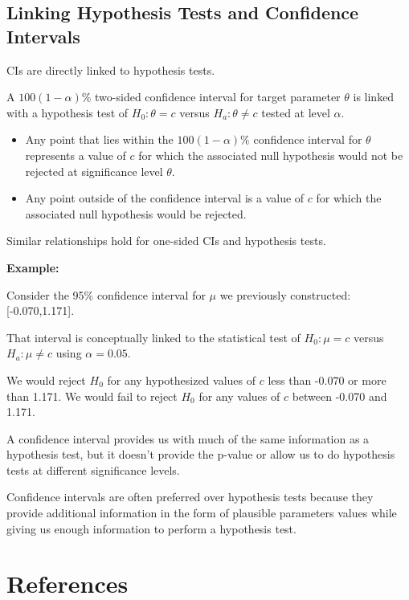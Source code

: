 \documentclass[
]{book}
\providecommand{\tightlist}{%
  \setlength{\itemsep}{0pt}\setlength{\parskip}{0pt}}
\theoremstyle{definition}
\theoremstyle{definition}
\theoremstyle{definition}
\theoremstyle{definition}
\theoremstyle{remark}
\begin{document}
\hypertarget{linking-hypothesis-tests-and-confidence-intervals}{%
\section{Linking Hypothesis Tests and Confidence Intervals}\label{linking-hypothesis-tests-and-confidence-intervals}}

CIs are directly linked to hypothesis tests.

A \(100(1-\alpha)\%\) two-sided confidence interval for target parameter \(\theta\) is linked with a hypothesis test of \(H_0:\theta = c\) versus \(H_a:\theta \neq c\) tested at level
\(\alpha\).

\begin{itemize}
\tightlist
\item
  Any point that lies within the \(100(1-\alpha)\%\) confidence interval for \(\theta\) represents a value of \(c\) for which the associated null hypothesis would not be rejected at significance level \(\theta\).
\item
  Any point outside of the confidence interval is a value of \(c\) for which the associated null hypothesis would be rejected.
\end{itemize}

Similar relationships hold for one-sided CIs and hypothesis tests.

\textbf{Example:}

Consider the 95\% confidence interval for \(\mu\) we previously
constructed: {[}-0.070,1.171{]}.

That interval is conceptually linked to the statistical test of \(H_0:\mu = c\) versus \(H_a:\mu \neq c\) using \(\alpha =0.05\).

We would reject \(H_0\) for any hypothesized values of \(c\) less than -0.070 or more than 1.171. We would fail to reject \(H_0\) for any values of \(c\) between -0.070 and 1.171.

A confidence interval provides us with much of the same information as a hypothesis test, but it doesn't provide the p-value or allow us to do hypothesis tests at different significance levels.

Confidence intervals are often preferred over hypothesis tests because they provide additional information in the form of plausible parameters values while giving us enough information to perform a hypothesis test.

\hypertarget{references}{%
\chapter*{References}\label{references}}
\end{document}
